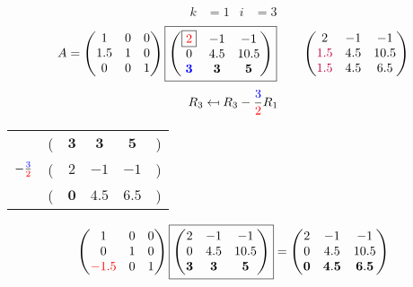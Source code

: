 \documentclass[pdf]{beamer}
\begin{document}
\begin{frame}{}\begin{align*} k &= 1 & i &= 3 \end{align*} $$A=\begin{pmatrix}1&0&0\\1.5&1&0\\0&0&1\end{pmatrix} \boxed{\begin{pmatrix}\boxed{{\color{red}2}}&-1&-1\\0&4.5&10.5\\\mathbf{{\color{blue}3}}&\mathbf{3}&\mathbf{5}\end{pmatrix}} \quad\quad \begin{pmatrix}2&-1&-1\\{\color{purple}1.5}&4.5&10.5\\{\color{purple}1.5}&4.5&6.5\end{pmatrix}$$ $$R_3 \mapsfrom R_3 - \frac{{\color{blue}3}}{{\color{red}2}} R_1$$ \begin{center}\begin{tabular}{cccccc}  &(& $ \mathbf{3} $ & $ \mathbf{3} $ & $ \mathbf{5} $ &)\\$ -\frac{{\color{blue}3}}{{\color{red}2}} $&(& $ 2 $ & $ -1 $ & $ -1 $ &)\\\hline  &(& $ \mathbf{0} $ & $ \mathbf{4.5} $ & $ \mathbf{6.5} $ &) \end{tabular}\end{center} $$ \begin{pmatrix}1&0&0\\0&1&0\\{\color{red}-1.5}&0&1\end{pmatrix} \boxed{\begin{pmatrix}2&-1&-1\\0&4.5&10.5\\\mathbf{3}&\mathbf{3}&\mathbf{5}\end{pmatrix}} = \begin{pmatrix}2&-1&-1\\0&4.5&10.5\\\mathbf{0}&\mathbf{4.5}&\mathbf{6.5}\end{pmatrix} $$\end{frame}
\end{document}
